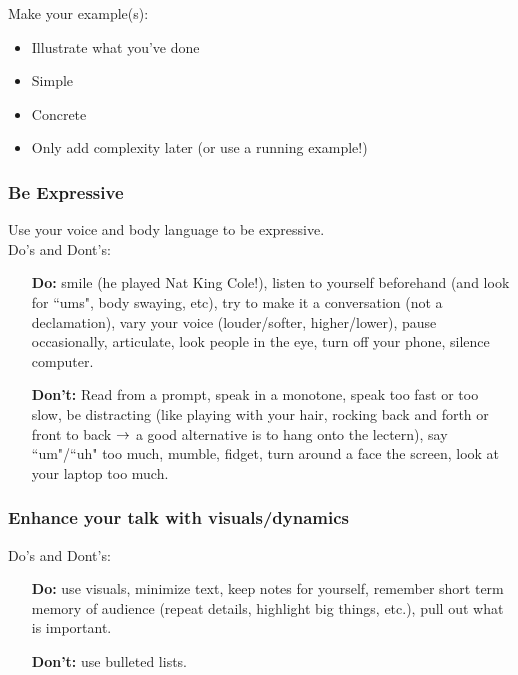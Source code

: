 Make your example(s):
\begin{itemize}
    \item Illustrate what you've done
    \item Simple
    \item Concrete
    \item Only add complexity later (or use a running example!)
\end{itemize}

\subsubsection{Be Expressive}

Use your voice and body language to be expressive. \\

Do's and Dont's:
\begin{itemize}
    \item[{\bf Do:}]  smile (he played Nat King Cole!), listen to yourself beforehand (and look for ``ums", body swaying, etc), try to make it a conversation (not a declamation), vary your voice (louder/softer, higher/lower), pause occasionally, articulate, look people in the eye, turn off your phone, silence computer.
    
    \vspace{4mm}
    
    \item[{\bf Don't:}] Read from a prompt, speak in a monotone, speak too fast or too slow, be distracting (like playing with your hair, rocking back and forth or front to back $\rightarrow$ a good alternative is to hang onto the lectern), say ``um"/``uh" too much, mumble, fidget, turn around a face the screen, look at your laptop too much.
\end{itemize}

\subsubsection{Enhance your talk with visuals/dynamics}

Do's and Dont's:
\begin{itemize}
    \item[{\bf Do:}] use visuals, minimize text, keep notes for yourself, remember short term memory of audience (repeat details, highlight big things, etc.), pull out what is important. 
    \vspace{4mm}
    
    \item[{\bf Don't:}] use bulleted lists.
\end{itemize}

